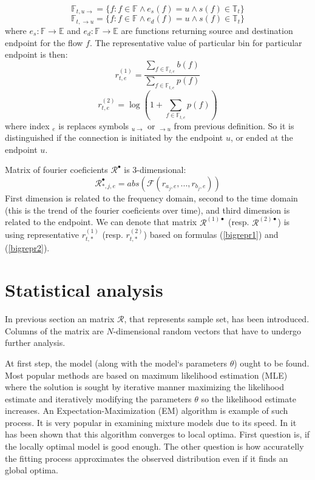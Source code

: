 \documentclass[a4paper,journal]{IEEEtran}
\begin{document}
\begin{equation}
\mathbb{F}_{t,u \rightarrow} = \{f : f \in \mathbb{F} \wedge e_{s}(f) = u \wedge s(f) \in \mathbb{T}_t \}
\end{equation}
\begin{equation}
\mathbb{F}_{t, \rightarrow u} = \{f : f \in \mathbb{F} \wedge e_{d}(f) = u \wedge s(f) \in \mathbb{T}_t \}
\end{equation}
where $e_{s}:\mathbb{F}\rightarrow \mathbb{E}$ and
$e_{d}:\mathbb{F}\rightarrow \mathbb{E}$ 
are functions returning source and destination endpoint for the 
flow $f$.
The representative value of particular bin for particular endpoint is 
then:
\begin{equation}\label{bigrepr1}
r_{t,e}^{(1)} = \frac{\sum\limits_{f\in \mathbb{F}_{t,e}}b(f)}{\sum\limits_{f\in \mathbb{F}_{t,e}}p(f)}
\end{equation}
\begin{equation}\label{bigrepr2}
r_{t,e}^{(2)} = \log(1+\sum\limits_{f\in \mathbb{F}_{t,e}}p(f))
\end{equation}
where index ${}_e$ is replaces symbols ${}_{u\rightarrow}$ or 
${}_{\rightarrow u}$ from previous definition. So it is distinguished 
if the connection is initiated by the endpoint $u$, or ended at the
endpoint $u$.

Matrix of fourier coeficients $\mathcal{R}^\bullet$ is 3-dimensional:
\begin{equation}\label{bigmatrix}
\mathcal{R}^\bullet_{*,j,e} = abs(\mathcal{F}(r_{a_j,e}, ..., r_{b_j,e}))
\end{equation}
First dimension is related to the frequency domain, second to the time domain 
(this is the trend of the fourier coeficients over time), 
and third dimension is related to the endpoint.
We can denote that matrix $\mathcal{R}^{(1)\bullet}$ (resp. $\mathcal{R}^{(2)\bullet}$)
is using representative $r_{t,*}^{(1)}$ (resp. $r_{t,*}^{(2)}$) based on formulas
(\ref{bigrepr1}) and (\ref{bigrepr2}).

\section{Statistical analysis}\label{sec:stats}
In previous section an matrix $\mathcal{R}$, that represents sample set, has been introduced.
Columns of the matrix are $N$-dimensional random vectors that have to undergo further analysis.

At first step, the model (along with the model`s parameters $\theta$) ought to be found.
Most popular methods are based on maximum likelihood estimation (MLE) where the solution is sought by 
iterative manner maximizing the likelihood estimate and iteratively modifying the parameters $\theta$ so the likelihood
estimate increases. An Expectation-Maximization (EM) algorithm is example of such process. It is very popular in 
examining mixture models due to its speed. In \cite{Bor04} it has been shown that this algorithm converges 
to local optima. First question is, if the locally optimal model is good enough. The other question is how accuratelly 
the fitting process approximates the observed distribution even if it finds an global optima.
\end{document}
